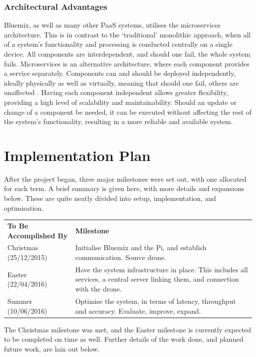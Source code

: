 \documentclass{article}
\begin{document}
\subsubsection{Architectural Advantages}
Bluemix, as well as many other PaaS systems, utilises the microservices architecture. This is in contrast to the `traditional' monolithic approach, when all of a system's functionality and processing is conducted centrally on a single device. All components are interdependent, and should one fail, the whole system fails. Microservices is an alternative architecture, where each component provides a service separately. Components can and should be deployed independently, ideally physically as well as virtually, meaning that should one fail, others are unaffected \cite{Microservices}. Having each component independent allows greater flexibility, providing a high level of scalability and maintainability. Should an update or change of a component be needed, it can be executed without affecting the rest of the system's functionality, resulting in a more reliable and available system.



\section{Implementation Plan}
After the project began, three major milestones were set out, with one allocated for each term. A brief summary is given here, with more details and expansions below. These are quite neatly divided into setup, implementation, and optimisation.

\vspace{\baselineskip} \noindent
\begin{tabular}{p{5cm} p{10cm}}
    \textbf{To Be Accomplished By} & \textbf{Milestone} \\
    Christmas (25/12/2015) & Initialise Bluemix and the Pi, and establish communication. Source drone. \\
    Easter    (22/04/2016) & Have the system infrastructure in place. This includes all services, a central server linking them, and connection with the drone. \\
    Summer    (10/06/2016) & Optimise the system, in terms of latency, throughput and accuracy. Evaluate, improve, expand. \\
\end{tabular}

\vspace{\baselineskip} \noindent
The Christmas milestone was met, and the Easter milestone is currently expected to be completed on time as well. Further details of the work done, and planned future work, are lain out below.
\end{document}
